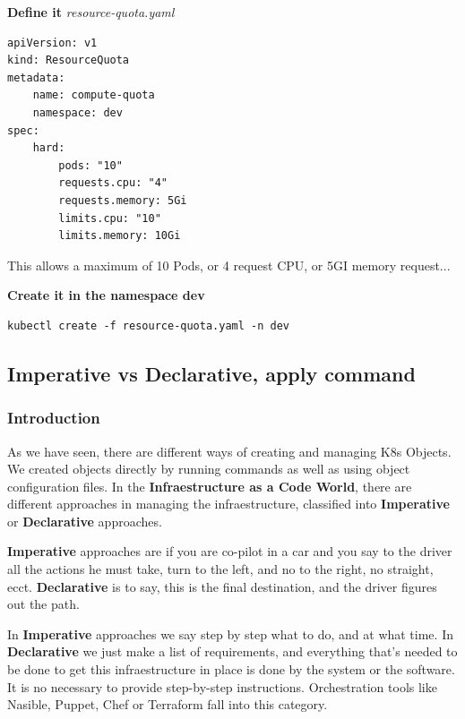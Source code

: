 \documentclass{article}
\newenvironment{codetemplate}[1][]{%
  \mybasecolorbox[#1]
  \itshape
}{%
  \endmybasecolorbox
}
\begin{document}
\textbf{Define it}
\begin{codetemplate}{resource-quota.yaml}
\begin{verbatim}
apiVersion: v1
kind: ResourceQuota
metadata:
    name: compute-quota
    namespace: dev
spec:
    hard:
        pods: "10"
        requests.cpu: "4"
        requests.memory: 5Gi
        limits.cpu: "10"
        limits.memory: 10Gi
\end{verbatim}
\end{codetemplate}

This allows a maximum of 10 Pods, or 4 request CPU, or 5GI memory request...

\textbf{Create it in the namespace dev}
\begin{codetemplate}{}
\begin{verbatim}
kubectl create -f resource-quota.yaml -n dev
\end{verbatim}
\end{codetemplate}

\subsection{Imperative vs Declarative, apply command}

\subsubsection{Introduction}

As we have seen, there are different ways of creating and managing K8s Objects. We created objects directly by running commands as well as using object configuration files. In the \textbf{Infraestructure as a Code World}, there are different approaches in managing the infraestructure, classified into \textbf{Imperative} or \textbf{Declarative} approaches.

\textbf{Imperative} approaches are if you are co-pilot in a car and you say to the driver all the actions he must take, turn to the left, and no to the right, no straight, ecct. \textbf{Declarative} is to say, this is the final destination, and the driver figures out the path.

In \textbf{Imperative} approaches we say step by step what to do, and at what time. In \textbf{Declarative} we just make a list of requirements, and everything that's needed to be done to get this infraestructure in place is done by the system or the software. It is no necessary to provide step-by-step instructions. Orchestration tools like Nasible, Puppet, Chef or Terraform fall into this category.
\end{document}
